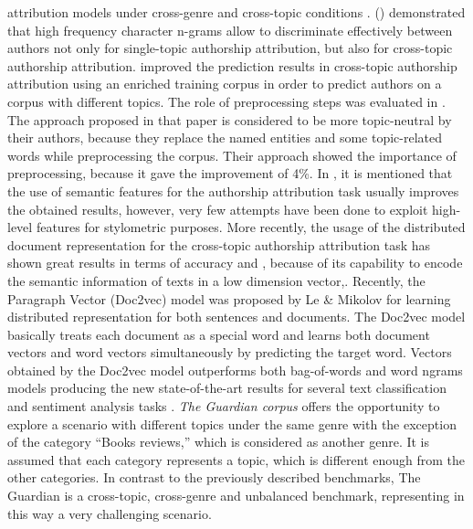attribution models under cross-genre and cross-topic conditions  \cite{gomez2018document}.
\citeauthor{stamatatos2013robustness} (\citeyear{stamatatos2013robustness}) demonstrated that high frequency character n-grams allow to discriminate effectively between authors
not only for single-topic authorship attribution, but also for cross-topic authorship attribution. \citeauthor{sapkota2014cross} \cite{sapkota2014cross} improved the prediction results in cross-topic authorship attribution using an enriched training corpus in order to predict authors on a corpus with different topics.
The role of preprocessing steps was evaluated in \cite{markov2017improving}. The approach proposed in
that paper is considered to be more topic-neutral by their authors, because they replace
the named entities and some topic-related words while preprocessing the corpus. Their
approach showed the importance of preprocessing, because it gave the improvement
of 4\%.
In \cite{stamatatos2013robustness}, it is mentioned that the use of semantic features for the authorship attribution task usually improves the obtained results, however, very few attempts have been done
to exploit high-level features for stylometric purposes. More recently, the
usage of the distributed document representation for the cross-topic authorship attribution task has shown great results in terms of accuracy \cite{posadas2017application} and \cite{gomez2018document}, because
of its capability to encode the semantic information of texts in a low dimension vector,.
Recently, the Paragraph Vector (Doc2vec) model was proposed by Le \&
Mikolov \cite{le2014distributed} for learning distributed representation for both sentences and documents. The Doc2vec model basically treats each document as a special word and learns
both document vectors and word vectors simultaneously by predicting the target word.
Vectors obtained by the Doc2vec model outperforms both bag-of-words and word ngrams models producing the new state-of-the-art results for several text classification and sentiment analysis tasks \cite{gomez2018document}.
\textit{The Guardian corpus} offers the opportunity to explore
a scenario with different topics under the same genre with
the exception of the category “Books reviews,” which is
considered as another genre. It is assumed that each category represents a topic, which is different enough from
the other categories. In contrast to the previously described
benchmarks, The Guardian is a cross-topic, cross-genre and
unbalanced benchmark, representing in this way a very challenging scenario.

